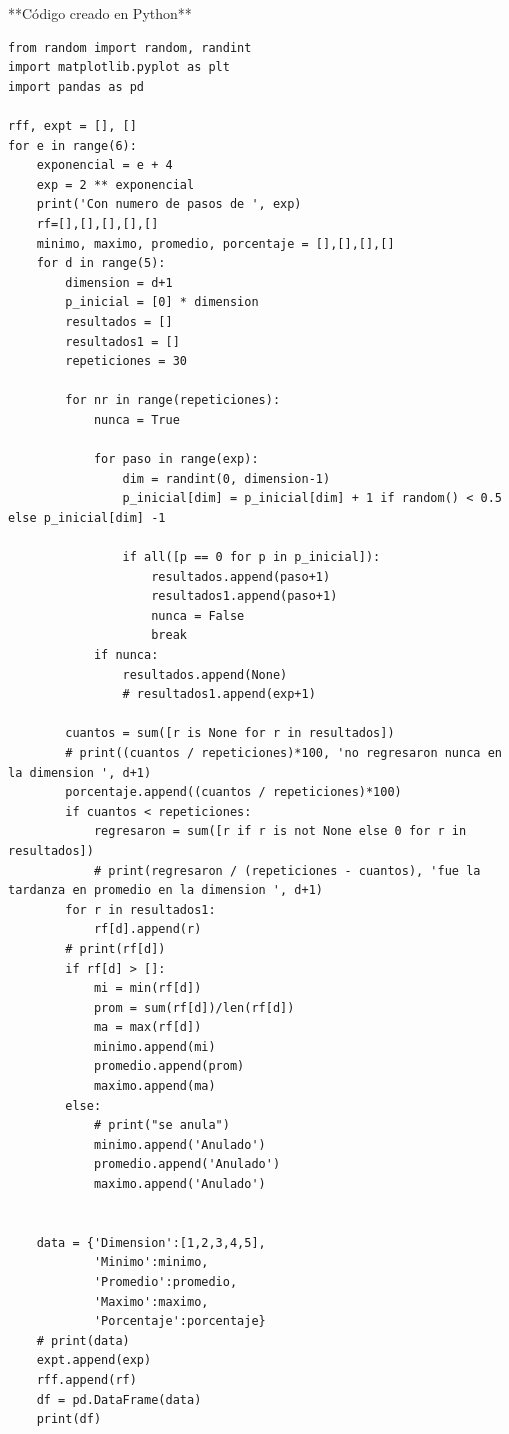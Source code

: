 \documentclass{article}
\begin{document}
**Código creado en Python**\\
\begin{verbatim}
from random import random, randint
import matplotlib.pyplot as plt 
import pandas as pd

rff, expt = [], []
for e in range(6):
    exponencial = e + 4
    exp = 2 ** exponencial
    print('Con numero de pasos de ', exp)
    rf=[],[],[],[],[]
    minimo, maximo, promedio, porcentaje = [],[],[],[]
    for d in range(5):
        dimension = d+1
        p_inicial = [0] * dimension
        resultados = []
        resultados1 = []
        repeticiones = 30
    
        for nr in range(repeticiones):
            nunca = True
    
            for paso in range(exp):
                dim = randint(0, dimension-1)
                p_inicial[dim] = p_inicial[dim] + 1 if random() < 0.5 else p_inicial[dim] -1
                
                if all([p == 0 for p in p_inicial]):
                    resultados.append(paso+1)
                    resultados1.append(paso+1)
                    nunca = False
                    break
            if nunca:
                resultados.append(None)
                # resultados1.append(exp+1)
        
        cuantos = sum([r is None for r in resultados])
        # print((cuantos / repeticiones)*100, 'no regresaron nunca en la dimension ', d+1)
        porcentaje.append((cuantos / repeticiones)*100)
        if cuantos < repeticiones:
            regresaron = sum([r if r is not None else 0 for r in resultados])
            # print(regresaron / (repeticiones - cuantos), 'fue la tardanza en promedio en la dimension ', d+1)
        for r in resultados1:
            rf[d].append(r) 
        # print(rf[d])
        if rf[d] > []:
            mi = min(rf[d])
            prom = sum(rf[d])/len(rf[d])
            ma = max(rf[d])
            minimo.append(mi)
            promedio.append(prom)
            maximo.append(ma)
        else:
            # print("se anula")
            minimo.append('Anulado')
            promedio.append('Anulado')
            maximo.append('Anulado')
        
            
    data = {'Dimension':[1,2,3,4,5], 
            'Minimo':minimo, 
            'Promedio':promedio, 
            'Maximo':maximo,
            'Porcentaje':porcentaje} 
    # print(data)
    expt.append(exp)
    rff.append(rf)
    df = pd.DataFrame(data)
    print(df)
        

\end{verbatim}
\end{document}
